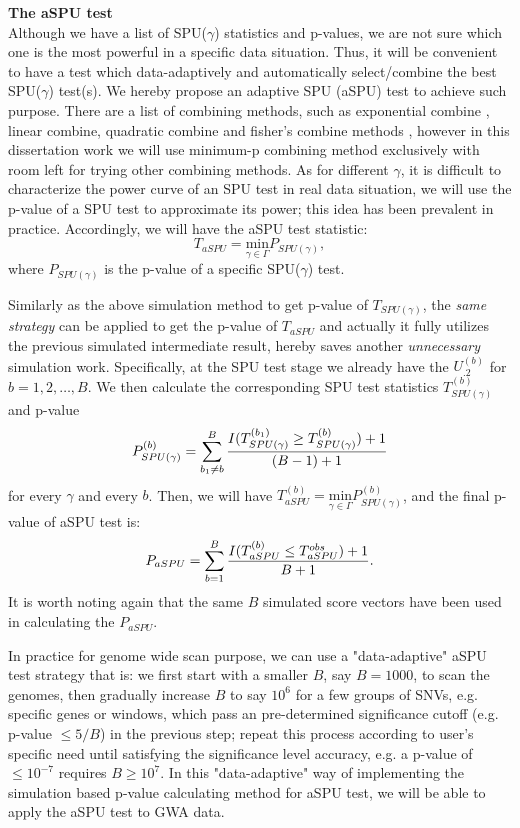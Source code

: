 \documentclass[12pt]{article}
\begin{document}
\textbf{The aSPU test}\\
Although we have a list of SPU($\gamma$) statistics and p-values, we are not sure which one is the most powerful in a specific data situation. Thus, it will be convenient to have a test which data-adaptively and automatically select/combine the best SPU($\gamma$) test(s). We hereby propose an adaptive SPU (aSPU) test to achieve such purpose. There are a list of combining methods, such as exponential combine \cite{Chen2012}, linear combine, quadratic combine and fisher's combine methods \cite{Luo2010,peng2009gene,Derkach2013}, however in this dissertation work we will use minimum-p combining method exclusively with room left for trying other combining methods. As for different $\gamma$, it is difficult to characterize the power curve of an SPU test in real data situation, we will use the p-value of a SPU test to approximate its power; this idea has been prevalent in practice. Accordingly, we will have the aSPU test statistic:
$$
T_{aSPU} = \underset{\gamma\in\Gamma}{ \textrm{min} } P_{ SPU(\gamma) },
$$
where $P_{ SPU(\gamma) }$ is the p-value of a specific SPU($\gamma$) test.

Similarly as the above simulation method to get p-value of $T_{ SPU(\gamma) }$, the \textit{same strategy} can be applied to get the p-value of $T_{aSPU}$ and actually it fully utilizes the previous simulated intermediate result, hereby saves another \textit{unnecessary} simulation work. Specifically, at the SPU test stage we already have the $U_{.2}^{ (b) }$ for $b = 1,2,\ldots,B$. We then calculate the corresponding SPU test statistics $T^{ (b) }_{ SPU(\gamma) }$ and p-value 
$$
P^{ (b) }_{ SPU(\gamma) } =  \sum_{b_1 \neq b}^B { I(T^{ (b_1) }_{ SPU(\gamma) } \geq T^{ (b) }_{ SPU(\gamma) } ) + 1  \over (B-1) + 1 } 
$$
for every $\gamma$ and every $b$. Then, we will have $ 
T ^ {(b)} _{aSPU} = \underset{\gamma\in\Gamma}{ \textrm{min} } P^{ (b) }_{ SPU(\gamma) }
$, and the final p-value of aSPU test is:
$$
P_{aSPU} = \sum_{b=1}^B { I(T ^ {(b)} _{aSPU} \leq T ^ {obs} _{aSPU} ) + 1  \over B + 1 }.
$$
It is worth noting again that the same $B$ simulated score vectors have been used in calculating the $P_{aSPU}$. 

In practice for genome wide scan purpose, we can use a "data-adaptive" aSPU test strategy that is: we first start with a smaller $B$, say $B = 1000$, to scan the genomes, then gradually increase $B$ to say $10^6$ for a few groups of SNVs, e.g. specific genes or windows, which pass an pre-determined significance cutoff (e.g. p-value $ \leq 5/B$) in the previous step; repeat this process according to user's specific need until satisfying the significance level accuracy, e.g. a p-value of $\leq 10 ^ {-7}$ requires $B \geq 10^7$. In this "data-adaptive" way of implementing the simulation based p-value calculating method for aSPU test, we will be able to apply the aSPU test to GWA data. 
\end{document}
